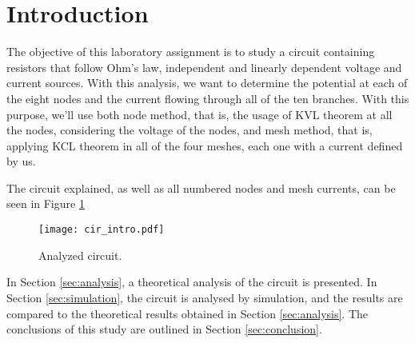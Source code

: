 \section{Introduction}
\label{sec:introduction}

The objective of this laboratory assignment is to study a circuit containing resistors that follow Ohm's law, independent and linearly dependent voltage and current sources. With this analysis, we want to determine the potential at each of the eight nodes and the current flowing through all of the ten branches.
With this purpose, we'll use both node method, that is, the usage of KVL theorem at all the nodes, considering the voltage of the nodes, and mesh method, that is, applying KCL theorem in all of the four meshes, each one with a current defined by us.
\par
The circuit explained, as well as all numbered nodes and mesh currents, can be seen in Figure \ref{fig:cir_intro}

\begin{figure}[H] \centering
\texttt{[image: cir\_intro.pdf]}
\caption{Analyzed circuit.}
\label{fig:cir_intro}
\end{figure}


In Section \ref{sec:analysis}, a theoretical analysis of the circuit is
presented. In Section \ref{sec:simulation}, the circuit is analysed by
simulation, and the results are compared to the theoretical results obtained in
Section \ref{sec:analysis}. The conclusions of this study are outlined in
Section \ref{sec:conclusion}.
